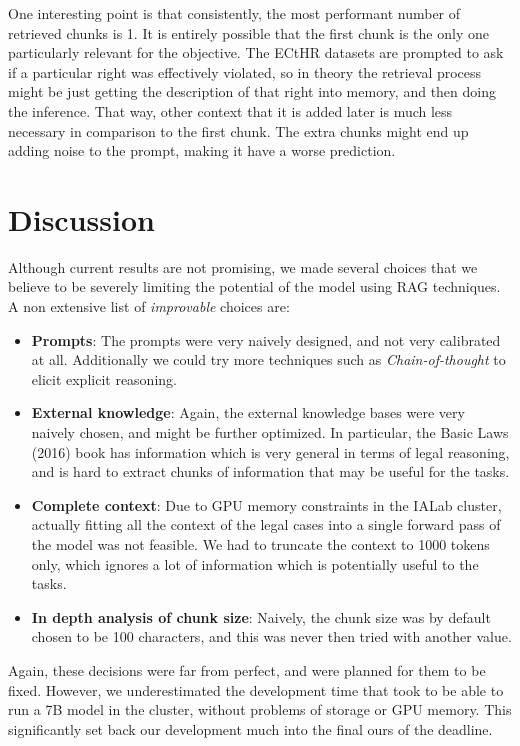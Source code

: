 \documentclass[11pt]{article}
\begin{document}
One interesting point is that consistently, the most performant number of retrieved chunks is 1. It is entirely possible that the first chunk is the only one particularly relevant for the objective. The ECtHR datasets are prompted to ask if a particular right was effectively violated, so in theory the retrieval process might be just getting the description of that right into memory, and then doing the inference. That way, other context that it is added later is much less necessary in comparison to the first chunk. The extra chunks might end up adding noise to the prompt, making it have a worse prediction.

\section{Discussion}
Although current results are not promising, we made several choices that we believe to be severely limiting the potential of the model using RAG techniques. A non extensive list of \textit{improvable} choices are:
\begin{itemize}
  \item \textbf{Prompts}: The prompts were very naively designed, and not very calibrated at all. Additionally we could try more techniques such as \textit{Chain-of-thought} \cite{wei2022chain} to elicit explicit reasoning.
  \item \textbf{External knowledge}: Again, the external knowledge bases were very naively chosen, and might be further optimized. In particular, the Basic Laws (2016) book has information which is very general in terms of legal reasoning, and is hard to extract chunks of information that may be useful for the tasks.
  \item \textbf{Complete context}: Due to GPU memory constraints in the IALab cluster, actually fitting all the context of the legal cases into a single forward pass of the model was not feasible. We had to truncate the context to 1000 tokens only, which ignores a lot of information which is potentially useful to the tasks.
  \item \textbf{In depth analysis of chunk size}: Naively, the chunk size was by default chosen to be 100 characters, and this was never then tried with another value.
\end{itemize}


Again, these decisions were far from perfect, and were planned for them to be fixed. However, we underestimated the development time that took to be able to run a 7B model in the cluster, without problems of storage or GPU memory. This significantly set back our development much into the final ours of the deadline.
\end{document}
